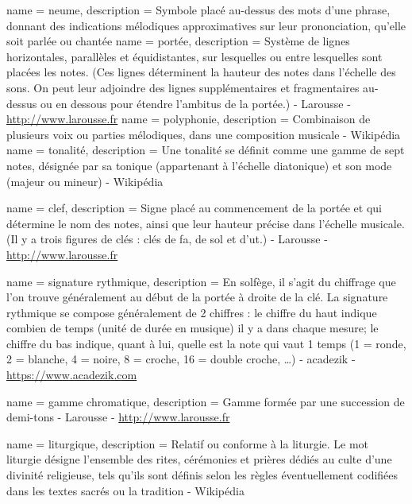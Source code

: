 {
        name = neume,
        description = {Symbole placé au-dessus des mots d'une phrase, donnant des indications mélodiques approximatives sur leur prononciation, qu'elle soit parlée ou chantée}        
}
{
	name = {port{é}e},
	description = {Système de lignes horizontales, parallèles et équidistantes, sur lesquelles ou entre lesquelles sont placées les notes. (Ces lignes déterminent la hauteur des notes dans l'échelle des sons. On peut leur adjoindre des lignes supplémentaires et fragmentaires au-dessus ou en dessous pour étendre l'ambitus de la portée.) - Larousse - \url{http://www.larousse.fr}}	
}
{
	name = {polyphonie},
	description = {Combinaison de plusieurs voix ou parties mélodiques, dans une composition musicale - Wikipédia}	
}
{
	name = {tonalit{é}},
	description = {Une tonalité se définit comme une gamme de sept notes, désignée par sa tonique (appartenant à l'échelle diatonique) et son mode (majeur ou mineur) - Wikipédia}
}

{
	name = {clef},
	description = {Signe placé au commencement de la portée et qui détermine le nom des notes, ainsi que leur hauteur précise dans l'échelle musicale. (Il y a trois figures de clés : clés de fa, de sol et d'ut.) - Larousse - \url{http://www.larousse.fr}}
}

{
	name = {signature rythmique},
	description = {En solfège, il s’agit du chiffrage que l’on trouve généralement au début de la portée à droite de la clé. La signature rythmique se compose généralement de 2 chiffres :
le chiffre du haut indique combien de temps (unité de durée en musique) il y a dans chaque mesure; 
le chiffre du bas indique, quant à lui, quelle est la note qui vaut 1 temps (1 = ronde, 2 = blanche, 4 = noire, 8 = croche, 16 = double croche, …) - acadezik - \url{https://www.acadezik.com}}
}

{
	name = {gamme chromatique},
	description = {Gamme formée par une succession de demi-tons - Larousse - \url{http://www.larousse.fr}}
}

{
	name = {liturgique},
	description = {Relatif ou conforme à la liturgie. Le mot liturgie désigne l'ensemble des rites, cérémonies et prières dédiés au culte d'une divinité religieuse, tels qu'ils sont définis selon les règles éventuellement codifiées dans les textes sacrés ou la tradition - Wikipédia}
}